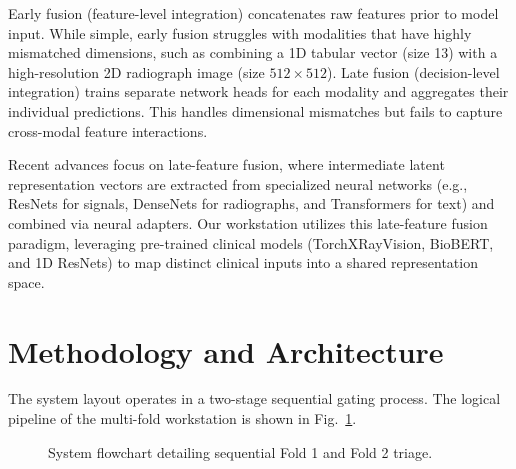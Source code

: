 \documentclass[11pt,onecolumn]{article}
\begin{document}
Early fusion (feature-level integration) concatenates raw features prior to model input. While simple, early fusion struggles with modalities that have highly mismatched dimensions, such as combining a 1D tabular vector (size 13) with a high-resolution 2D radiograph image (size $512 \times 512$). Late fusion (decision-level integration) trains separate network heads for each modality and aggregates their individual predictions. This handles dimensional mismatches but fails to capture cross-modal feature interactions.

Recent advances focus on late-feature fusion, where intermediate latent representation vectors are extracted from specialized neural networks (e.g., ResNets for signals, DenseNets for radiographs, and Transformers for text) and combined via neural adapters. Our workstation utilizes this late-feature fusion paradigm, leveraging pre-trained clinical models (TorchXRayVision, BioBERT, and 1D ResNets) to map distinct clinical inputs into a shared representation space.

\section{Methodology and Architecture}
The system layout operates in a two-stage sequential gating process. The logical pipeline of the multi-fold workstation is shown in Fig.~\ref{fig:system_flow}.

\begin{figure}[htbp]
\centering
{}
\caption{System flowchart detailing sequential Fold 1 and Fold 2 triage.}
\label{fig:system_flow}
\end{figure}
\end{document}
